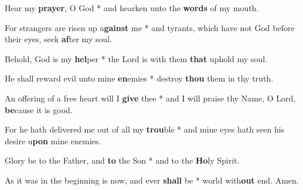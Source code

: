 \begin{multicols}{2}
	Hear my \textbf{prayer}, O God * and hearken unto the \textbf{words} of my mouth.
	
	For strangers are risen up a\textbf{gainst} me * and tyrants, which have not God before their eyes, seek \textbf{af}ter my soul.
	
	Behold, God is my \textbf{hel}per * the Lord is with them \textbf{that} uphold my soul.
	
	He shall reward evil unto mine \textbf{en}emies * destroy \textbf{thou} them in thy truth.
	
	An offering of a free heart will I \textbf{give} thee * and I will praise thy Name, O Lord, \textbf{be}cause it is good.
	
	For he hath delivered me out of all my \textbf{trou}ble * and mine eyes hath seen his desire u\textbf{pon} mine enemies.
	
	Glory be to the Father, and \textbf{to} the Son * and to the \textbf{Ho}ly Spirit.
	
	As it was in the beginning is now, and ever \textbf{shall} be * world with\textbf{out} end. Amen.
\end{multicols}